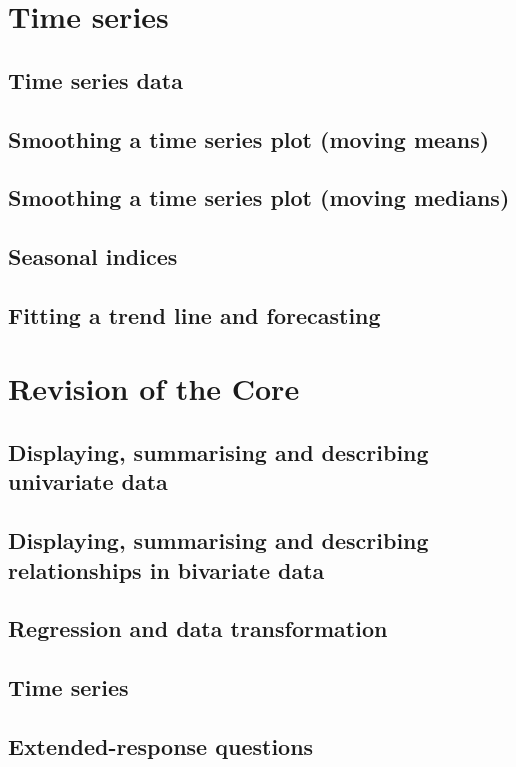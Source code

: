 \documentclass[a4paper,11pt]{article}
\begin{document}
\newpage

\section{Time series}
\begin{outline}

\0
\subsection{Time series data}

\0
\subsection{Smoothing a time series plot (moving means)}

\0
\subsection{Smoothing a time series plot (moving medians)}

\0
\subsection{Seasonal indices}

\0
\subsection{Fitting a trend line and forecasting}

\end{outline}

\newpage

\section{Revision of the Core}
\begin{outline}

\0
\subsection{Displaying, summarising and describing univariate data}

\0
\subsection{Displaying, summarising and describing relationships in bivariate data}

\0
\subsection{Regression and data transformation}

\0
\subsection{Time series}

\0
\subsection{Extended-response questions}

\end{outline}
\end{document}
